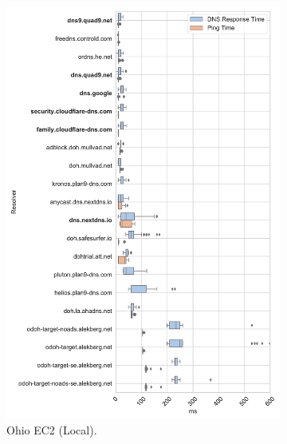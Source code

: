 \begin{figure}[h!]
\begin{subfigure}[b]{0.35\textwidth}
\includegraphics[width=\textwidth]{figures/ohio_NA.pdf}
    \caption{Ohio EC2 (Local).}
\end{subfigure}
%
\hfill \\
\begin{subfigure}[b]{0.35\textwidth}

\end{subfigure}
\end{figure}
